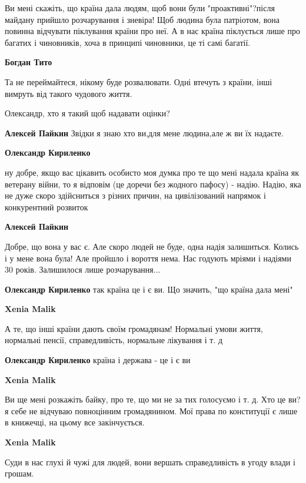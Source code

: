 \begin{itemize}
\begin{itemize}
Ви мені скажіть, що країна дала людям, щоб вони були "проактивні"?після майдану
прийшло розчарування і зневіра! Щоб людина була патріотом, вона повинна відчувати
піклування країни про неї. А в нас країна піклується лише про багатих і
чиновників, хоча в принципі чиновники, це ті самі багатії.


\textbf{Богдан Тито} 

Та не переймайтеся, нікому буде розвалювати. Одні втечуть з країни, інші
вимруть від такого чудового життя.

Олександр, хто я такий щоб надавати оцінки?

\textbf{Алексей Пайкин} Звідки я знаю хто ви,для мене людина,але ж ви їх надаєте.

\textbf{Олександр Кириленко} 

ну добре, якщо вас цікавить особисто моя думка про те що мені надала країна як
ветерану війни, то я відповім (це доречи без жодного пафосу) - надію. Надію,
яка не дуже скоро здійсниться з різних причин, на цивілізований напрямок і
конкурентний розвиток


\textbf{Алексей Пайкин} 

Добре, що вона у вас є. Але скоро людей не буде, одна надія залишиться. Колись і у
мене вона була! Але пройшло і вороття нема. Нас годують мріями і надіями 30
років. Залишилося лише розчарування...

\textbf{Олександр Кириленко} так країна це і є ви. Що значить, "що країна дала мені"

\textbf{Xenia Malik} 

А те, що інші країни дають своїм громадянам! Нормальні умови життя, нормальні
пенсії, справедливість, нормальне лікування і т. д


\textbf{Олександр Кириленко} країна і держава - це і є ви

\textbf{Xenia Malik} 

Ви ще мені розкажіть байку, про те, що ми не за тих голосуємо і т. д. Хто це ви? я
себе не відчуваю повноцінним громадянином. Мої права по конституції є лише в
книжечці, на цьому все закінчується.

\textbf{Xenia Malik} 

Суди в нас глухі й чужі для людей, вони вершать справедливість в угоду влади і
грошам.


\end{itemize}
\end{itemize}
